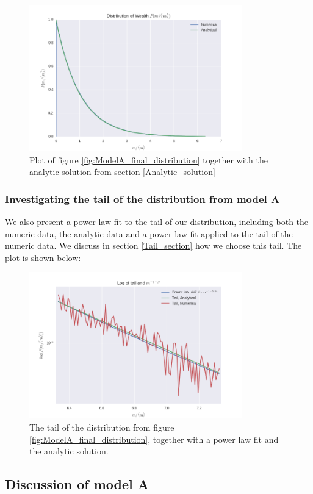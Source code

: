 \documentclass[a4paper, 10pt]{article}
\begin{document}
\begin{figure}[!hb]
\centering
\includegraphics[height=2.5in]{distLamb0WAnalyt.png} %
\caption{Plot of figure \ref{fig:ModelA_final_distribution} together with the analytic solution from section \ref{Analytic_solution}}\label{fig:ModelA_final_distribution_with_analytic}
\end{figure}
\newpage
\subsubsection{Investigating the tail of the distribution from model A}
We also present a power law fit to the tail of our distribution, including both the numeric data, the analytic data and a power law fit applied to the tail of the numeric data. We discuss in section \ref{Tail_section} how we choose this tail. The plot is shown below:
\begin{figure}[!ht]
\centering
\includegraphics[height=2.5in]{tailPowerlamb0.png} %
\caption{The tail of the distribution from figure \ref{fig:ModelA_final_distribution}, together with a power law fit and the analytic solution.}\label{fig:ModelA_tail}
\end{figure}
\subsection{Discussion of model A}
\end{document}
